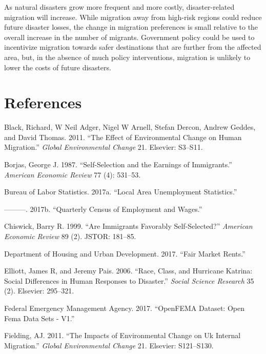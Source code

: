 \documentclass[]{article}
\begin{document}
As natural disasters grow more frequent and more costly,
disaster-related migration will increase. While migration away from
high-risk regions could reduce future disaster losses, the change in
migration preferences is small relative to the overall increase in the
number of migrants. Government policy could be used to incentivize
migration towards safer destinations that are further from the affected
area, but, in the absence of much policy interventions, migration is
unlikely to lower the costs of future disasters.

\newpage

\section{References}\label{references}

\hypertarget{refs}{}
\hypertarget{ref-black2011effect}{}
Black, Richard, W Neil Adger, Nigel W Arnell, Stefan Dercon, Andrew
Geddes, and David Thomas. 2011. ``The Effect of Environmental Change on
Human Migration.'' \emph{Global Environmental Change} 21. Elsevier:
S3--S11.

\hypertarget{ref-borjas1987self}{}
Borjas, George J. 1987. ``Self-Selection and the Earnings of
Immigrants.'' \emph{American Economic Review} 77 (4): 531--53.

\hypertarget{ref-blsdata}{}
Bureau of Labor Statistics. 2017a. ``Local Area Unemployment
Statistics.''

\hypertarget{ref-qcewdata}{}
---------. 2017b. ``Quarterly Census of Employment and Wages.''

\hypertarget{ref-chiswick1999immigrants}{}
Chiswick, Barry R. 1999. ``Are Immigrants Favorably Self-Selected?''
\emph{American Economic Review} 89 (2). JSTOR: 181--85.

\hypertarget{ref-hudrentdata}{}
Department of Housing and Urban Development. 2017. ``Fair Market
Rents.''

\hypertarget{ref-elliott2006race}{}
Elliott, James R, and Jeremy Pais. 2006. ``Race, Class, and Hurricane
Katrina: Social Differences in Human Responses to Disaster.''
\emph{Social Science Research} 35 (2). Elsevier: 295--321.

\hypertarget{ref-femadecs}{}
Federal Emergency Management Agency. 2017. ``OpenFEMA Dataset: Open Fema
Data Sets - V1.''

\hypertarget{ref-fielding2011impacts}{}
Fielding, AJ. 2011. ``The Impacts of Environmental Change on Uk Internal
Migration.'' \emph{Global Environmental Change} 21. Elsevier:
S121--S130.
\end{document}
